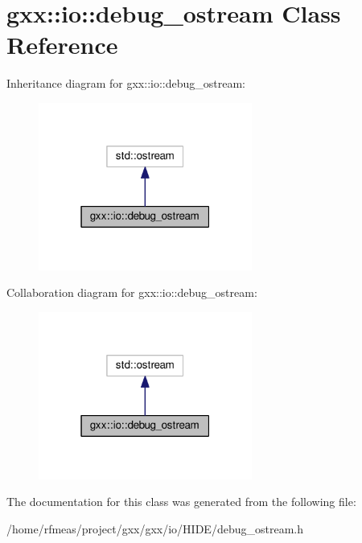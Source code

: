 \hypertarget{classgxx_1_1io_1_1debug__ostream}{}\section{gxx\+:\+:io\+:\+:debug\+\_\+ostream Class Reference}
\label{classgxx_1_1io_1_1debug__ostream}


Inheritance diagram for gxx\+:\+:io\+:\+:debug\+\_\+ostream\+:
\nopagebreak
\begin{figure}[H]
\begin{center}
\leavevmode
\includegraphics[width=199pt]{classgxx_1_1io_1_1debug__ostream__inherit__graph}
\end{center}
\end{figure}


Collaboration diagram for gxx\+:\+:io\+:\+:debug\+\_\+ostream\+:
\nopagebreak
\begin{figure}[H]
\begin{center}
\leavevmode
\includegraphics[width=199pt]{classgxx_1_1io_1_1debug__ostream__coll__graph}
\end{center}
\end{figure}


The documentation for this class was generated from the following file\+:\begin{DoxyCompactItemize}
\item 
/home/rfmeas/project/gxx/gxx/io/\+H\+I\+D\+E/debug\+\_\+ostream.\+h\end{DoxyCompactItemize}

